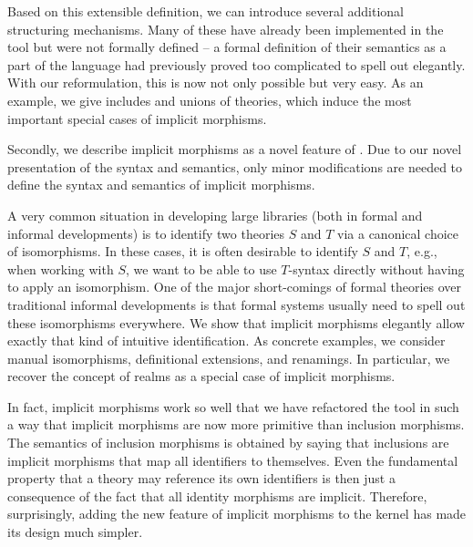Based on this extensible definition, we can introduce several additional structuring mechanisms.
Many of these have already been implemented in the \mmt tool but were not formally defined  -- a formal definition of their semantics as a part of the \mmt language had previously proved too complicated to spell out elegantly.
With our reformulation, this is now not only possible but very easy.
As an example, we give includes and unions of theories, which induce the most important special cases of implicit morphisms.
\medskip

Secondly, we describe implicit morphisms as a novel feature of \mmt.
Due to our novel presentation of the syntax and semantics, only minor modifications are needed to define the syntax and semantics of implicit morphisms.

A very common situation in developing large libraries (both in formal and informal developments) is to identify two theories $S$ and $T$ via a canonical choice of isomorphisms.
In these cases, it is often desirable to identify $S$ and $T$, e.g., when working with $S$, we want to be able to use $T$-syntax directly without having to apply an isomorphism.
One of the major short-comings of formal theories over traditional informal developments is that formal systems usually need to spell out these isomorphisms everywhere.
We show that implicit morphisms elegantly allow exactly that kind of intuitive identification.
As concrete examples, we consider manual isomorphisms, definitional extensions, and renamings.
In particular, we recover the concept of realms \cite{realms} as a special case of implicit morphisms.

In fact, implicit morphisms work so well that we have refactored the \mmt tool in such a way that implicit morphisms are now more primitive than inclusion morphisms.
The semantics of inclusion morphisms is obtained by saying that inclusions are implicit morphisms that map all identifiers to themselves.
Even the fundamental property that a theory may reference its own identifiers is then just a consequence of the fact that all identity morphisms are implicit.
Therefore, surprisingly, adding the new feature of implicit morphisms to the \mmt kernel has made its design much simpler.
